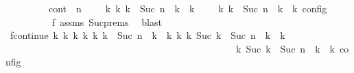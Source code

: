 \begin{isabellebody}
\ \ \ \ \ \ \ \ \ cont{\isacharcolon}\ {\isacartoucheopen}{\isacharparenleft}{\isacharparenleft}{\isasymGamma}{\isacharcomma}\ n\ {\isasymturnstile}\ {\isasymPsi}\ {\isasymtriangleright}\ {\isasymPhi}{\isacharparenright}\ {\isasymhookrightarrow}\isactrlbsup k\isactrlesup \ {\isacharparenleft}{\isasymGamma}\isactrlsub k{\isacharcomma}\ {\isasymdelta}k\ {\isacharplus}\ Suc\ n\ {\isasymturnstile}\ {\isasymPsi}\isactrlsub k\ {\isasymtriangleright}\ {\isasymPhi}\isactrlsub k{\isacharparenright}{\isacharparenright}\ {\isasymand}\ {\isasymrho}\ {\isasymin}\ {\isasymlbrakk}\ {\isasymGamma}\isactrlsub k{\isacharcomma}\ {\isasymdelta}k\ {\isacharplus}\ Suc\ n\ {\isasymturnstile}\ {\isasymPsi}\isactrlsub k\ {\isasymtriangleright}\ {\isasymPhi}\isactrlsub k\ {\isasymrbrakk}\isactrlsub c\isactrlsub o\isactrlsub n\isactrlsub f\isactrlsub i\isactrlsub g{\isacartoucheclose}\isanewline
\ \ \ \ \ \ \ \ \isamarkupfalse%
\ f{}\ assms{\isacharparenleft}{}{\isacharparenright}\ Suc{\isachardot}prems\ \isamarkupfalse%
\ blast\isanewline
\ \ \ \ \ \ \isamarkupfalse%
\ \isamarkupfalse%
\ fcontinue{\isacharcolon}\ {\isacartoucheopen}{\isasymexists}{\isasymGamma}\isactrlsub k{\isacharprime}\ {\isasymPsi}\isactrlsub k{\isacharprime}\ {\isasymPhi}\isactrlsub k{\isacharprime}\ k{\isacharprime}{\isachardot}\ {\isacharparenleft}{\isacharparenleft}{\isasymGamma}\isactrlsub k{\isacharcomma}\ {\isasymdelta}k\ {\isacharplus}\ Suc\ n\ {\isasymturnstile}\ {\isasymPsi}\isactrlsub k\ {\isasymtriangleright}\ {\isasymPhi}\isactrlsub k{\isacharparenright}\ {\isasymhookrightarrow}\isactrlbsup k{\isacharprime}\isactrlesup \ {\isacharparenleft}{\isasymGamma}\isactrlsub k{\isacharprime}{\isacharcomma}\ Suc\ {\isacharparenleft}{\isasymdelta}k\ {\isacharplus}\ Suc\ n{\isacharparenright}\ {\isasymturnstile}\ {\isasymPsi}\isactrlsub k{\isacharprime}\ {\isasymtriangleright}\ {\isasymPhi}\isactrlsub k{\isacharprime}{\isacharparenright}{\isacharparenright}\isanewline
\ \ \ \ \ \ \ \ \ \ \ \ \ \ \ \ \ \ \ \ \ \ \ \ \ \ \ \ \ \ \ \ \ \ \ \ \ \ \ \ \ \ \ \ {\isasymand}\ {\isasymrho}\ {\isasymin}\ {\isasymlbrakk}\ {\isasymGamma}\isactrlsub k{\isacharprime}{\isacharcomma}\ Suc\ {\isacharparenleft}{\isasymdelta}k\ {\isacharplus}\ Suc\ n{\isacharparenright}\ {\isasymturnstile}\ {\isasymPsi}\isactrlsub k{\isacharprime}\ {\isasymtriangleright}\ {\isasymPhi}\isactrlsub k{\isacharprime}\ {\isasymrbrakk}\isactrlsub c\isactrlsub o\isactrlsub n\isactrlsub f\isactrlsub i\isactrlsub g{\isacartoucheclose}\isanewline
\ \ \ \ \ \ \ \ \isamarkupfalse%

\end{isabellebody}
